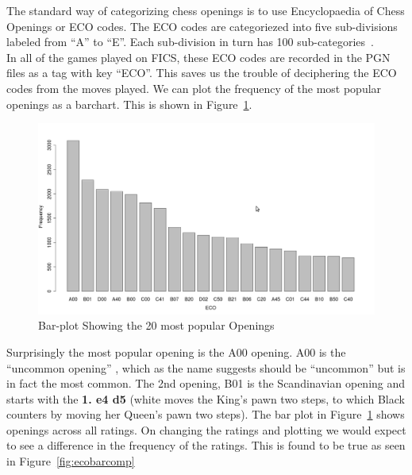 \documentclass{article}
\begin{document}
The standard way of categorizing chess openings is to use Encyclopaedia of Chess Openings or ECO codes. The ECO codes are categoriezed into five sub-divisions labeled from ``A'' to ``E''. Each sub-division in turn has 100 sub-categories~\cite{wiki:eco}.\\

In all of the games played on FICS, these ECO codes are recorded in the PGN files as a tag with key ``ECO''. This saves us the trouble of deciphering the ECO codes from the moves played. We can plot the frequency of the most popular openings as a barchart. This is shown in Figure~\ref{fig:ecobar}.

\begin{figure} [htp]
\begin{center}
\includegraphics[width=5in]{eco_bar.png}
\end{center}
\caption{Bar-plot Showing the 20 most popular Openings}
\label{fig:ecobar}
\end{figure}

Surprisingly the most popular opening is the A00 opening. A00 is the ``uncommon opening'' , which as the name suggests should be ``uncommon'' but is in fact the most common. The 2nd opening, B01 is the Scandinavian opening and starts with the {\bf 1. e4 d5} (white moves the King's pawn two steps, to which Black counters by moving her Queen's pawn two steps). The bar plot in Figure~\ref{fig:ecobar} shows openings across all ratings. On changing the ratings and plotting we would expect to see a difference in the frequency of the ratings. This is found to be true as seen in Figure~\ref{fig:ecobarcomp}
\end{document}

